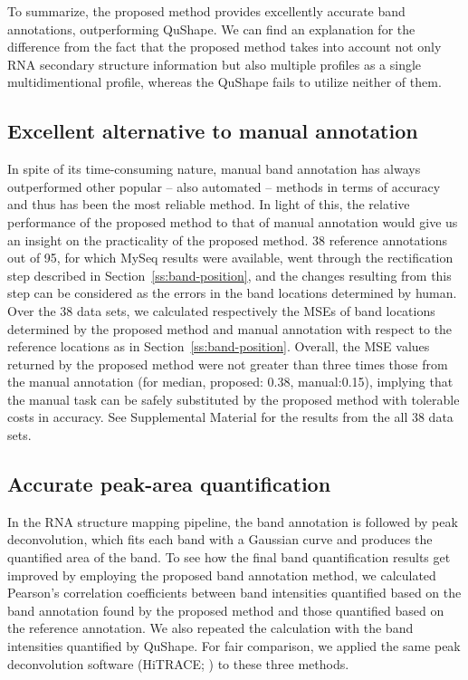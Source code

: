 To summarize, the proposed method provides excellently accurate band annotations, outperforming QuShape. We can find an explanation for the difference from the fact that the proposed method takes into account not only RNA secondary structure information but also multiple profiles as a single multidimentional profile, whereas the QuShape fails to utilize neither of them.


\subsection{Excellent alternative to manual annotation}\label{ss:compare-with-manual-annotation}
In spite of its time-consuming nature, manual band annotation has always outperformed other popular -- also automated -- methods in terms of accuracy and thus has been the most reliable method. In light of this, the relative performance of the proposed method to that of manual annotation would give us an insight on the practicality of the proposed method. 38 reference annotations out of 95, for which MySeq results were available, went through the rectification step described in Section~\ref{ss:band-position}, and the changes resulting from this step can be considered as the errors in the band locations determined by human. Over the 38 data sets, we calculated respectively the MSEs of band locations determined by the proposed method and manual annotation with respect to the reference locations as in Section~\ref{ss:band-position}. Overall, the MSE values returned by the proposed method were not greater than three times those from the manual annotation (for median, proposed: 0.38, manual:0.15), implying that the manual task can be safely substituted by the proposed method with tolerable costs in accuracy. See Supplemental Material for the results from the all 38 data sets.


\subsection{Accurate peak-area quantification}\label{ss:peak-area}
In the RNA structure mapping pipeline, the band annotation is followed by peak deconvolution, which fits each band with a Gaussian curve and produces the quantified area of the band. To see how the final band quantification results get improved by employing the proposed band annotation method, we calculated Pearson's correlation coefficients between band intensities quantified based on the band annotation found by the proposed method and those quantified based on the reference annotation. We also repeated the calculation with the band intensities quantified by QuShape. For fair comparison, we applied the same peak deconvolution software (HiTRACE; \citealp{Yoon2011}) to these three methods.

